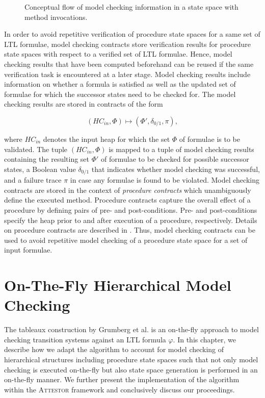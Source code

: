 \documentclass[a4paper, 12pt, twoside]{report}
\begin{document}
\begin{figure}
\begin{center}
{\begin{tikzpicture}
				\end{tikzpicture}}
			\caption{Conceptual flow of model checking information in a state space with method invocations.}\label{fig:otf_hierarchy}
		\end{center}
	\end{figure}	

	In order to avoid repetitive verification of procedure state spaces for a same set of LTL formulae, model checking contracts store verification results for procedure state spaces with respect to a verified set of LTL formulae. Hence, model checking results that have been computed beforehand can be reused if the same verification task is encountered at a later stage. Model checking results include information on whether a formula is satisfied as well as the updated set of formulae for which the successor states need to be checked for. The model checking results are stored in contracts of the form
	
	\[(HC_{in}, \Phi) \mapsto (\Phi', \delta_{0/1}, \pi),\]
	
	where $HC_{in}$ denotes the input heap for which the set $\Phi$ of formulae is to be validated. The tuple $(HC_{in}, \Phi)$ is mapped to a tuple of model checking results containing the resulting set $\Phi'$ of formulae to be checked for possible successor states, a Boolean value $\delta_{0/1}$ that indicates whether model checking was successful, and a failure trace $\pi$ in case any formulae is found to be violated. Model checking contracts are stored in the context of \textit{procedure contracts} which unambiguously define the executed method. Procedure contracts capture the overall effect of a procedure by defining pairs of pre- and post-conditions. Pre- and post-conditions specify the heap prior to and after execution of a procedure, respectively. Details on procedure contracts are described in \cite{jansen2014generating}. Thus, model checking contracts can be used to avoid repetitive model checking of a procedure state space for a set of input formulae.
	
	\chapter{On-The-Fly Hierarchical Model Checking}\label{chp:otf}
	
	The tableaux construction by Grumberg et al. \cite{bhat1995efficient} is an on-the-fly approach to model checking transition systems against an LTL formula $\varphi$. In this chapter, we describe how we adapt the algorithm to account for model checking of hierarchical structures including procedure state spaces such that not only model checking is executed on-the-fly but also state space generation is performed in an on-the-fly manner. We further present the implementation of the algorithm within the \textsc{Attestor} framework and conclusively discuss our proceedings.
	
\end{document}
